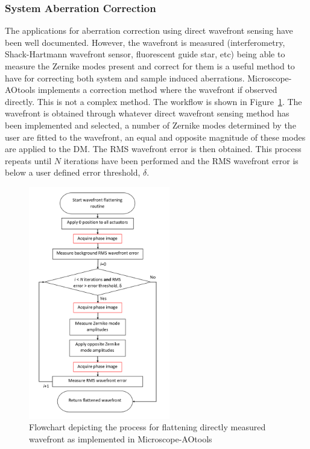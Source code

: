 \subsubsection{System Aberration Correction}
\label{subsubsec:system_correction}

The applications for aberration correction using direct wavefront sensing have been well documented. However, the wavefront is measured (interferometry, Shack-Hartmann wavefront sensor, fluorescent guide star, etc) being able to measure the Zernike modes present and correct for them is a useful method to have for correcting both system and sample induced aberrations. Microscope-AOtools implements a correction method where the wavefront if observed directly. This is not a complex method. The workflow is shown in Figure~\ref{fig:direct_wavefront_flattening_workflow}. The wavefront is obtained through whatever direct wavefront sensing method has been implemented and selected, a number of Zernike modes determined by the user are fitted to the wavefront, an equal and opposite magnitude of these modes are applied to the DM. The RMS wavefront error is then obtained. This process repeats until $N$ iterations have been performed and the RMS wavefront error is below a user defined error threshold, $\delta$.

\begin{figure}[h]
	\centering
	\includegraphics[width=0.55\textwidth, scale=0.5]{./images/direct_wavefront_flattening_workflow.png}
	\caption{Flowchart depicting the process for flattening directly measured wavefront as implemented in Microscope-AOtools}
	\label{fig:direct_wavefront_flattening_workflow}
\end{figure}

